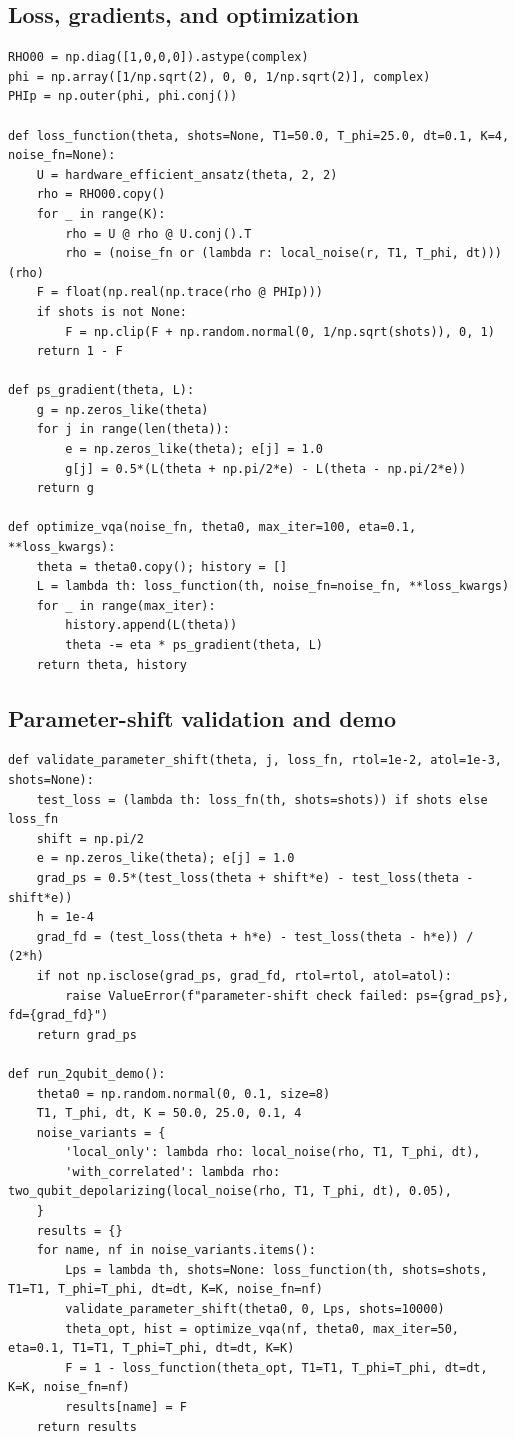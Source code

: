 \documentclass[11pt]{article}
\begin{document}
\subsection*{Loss, gradients, and optimization}
\begin{lstlisting}
RHO00 = np.diag([1,0,0,0]).astype(complex)
phi = np.array([1/np.sqrt(2), 0, 0, 1/np.sqrt(2)], complex)
PHIp = np.outer(phi, phi.conj())

def loss_function(theta, shots=None, T1=50.0, T_phi=25.0, dt=0.1, K=4, noise_fn=None):
    U = hardware_efficient_ansatz(theta, 2, 2)
    rho = RHO00.copy()
    for _ in range(K):
        rho = U @ rho @ U.conj().T
        rho = (noise_fn or (lambda r: local_noise(r, T1, T_phi, dt)))(rho)
    F = float(np.real(np.trace(rho @ PHIp)))
    if shots is not None:
        F = np.clip(F + np.random.normal(0, 1/np.sqrt(shots)), 0, 1)
    return 1 - F

def ps_gradient(theta, L):
    g = np.zeros_like(theta)
    for j in range(len(theta)):
        e = np.zeros_like(theta); e[j] = 1.0
        g[j] = 0.5*(L(theta + np.pi/2*e) - L(theta - np.pi/2*e))
    return g

def optimize_vqa(noise_fn, theta0, max_iter=100, eta=0.1, **loss_kwargs):
    theta = theta0.copy(); history = []
    L = lambda th: loss_function(th, noise_fn=noise_fn, **loss_kwargs)
    for _ in range(max_iter):
        history.append(L(theta))
        theta -= eta * ps_gradient(theta, L)
    return theta, history
\end{lstlisting}

\subsection*{Parameter-shift validation and demo}
\begin{lstlisting}
def validate_parameter_shift(theta, j, loss_fn, rtol=1e-2, atol=1e-3, shots=None):
    test_loss = (lambda th: loss_fn(th, shots=shots)) if shots else loss_fn
    shift = np.pi/2
    e = np.zeros_like(theta); e[j] = 1.0
    grad_ps = 0.5*(test_loss(theta + shift*e) - test_loss(theta - shift*e))
    h = 1e-4
    grad_fd = (test_loss(theta + h*e) - test_loss(theta - h*e)) / (2*h)
    if not np.isclose(grad_ps, grad_fd, rtol=rtol, atol=atol):
        raise ValueError(f"parameter-shift check failed: ps={grad_ps}, fd={grad_fd}")
    return grad_ps

def run_2qubit_demo():
    theta0 = np.random.normal(0, 0.1, size=8)
    T1, T_phi, dt, K = 50.0, 25.0, 0.1, 4
    noise_variants = {
        'local_only': lambda rho: local_noise(rho, T1, T_phi, dt),
        'with_correlated': lambda rho: two_qubit_depolarizing(local_noise(rho, T1, T_phi, dt), 0.05),
    }
    results = {}
    for name, nf in noise_variants.items():
        Lps = lambda th, shots=None: loss_function(th, shots=shots, T1=T1, T_phi=T_phi, dt=dt, K=K, noise_fn=nf)
        validate_parameter_shift(theta0, 0, Lps, shots=10000)
        theta_opt, hist = optimize_vqa(nf, theta0, max_iter=50, eta=0.1, T1=T1, T_phi=T_phi, dt=dt, K=K)
        F = 1 - loss_function(theta_opt, T1=T1, T_phi=T_phi, dt=dt, K=K, noise_fn=nf)
        results[name] = F
    return results
\end{lstlisting}
\end{document}
